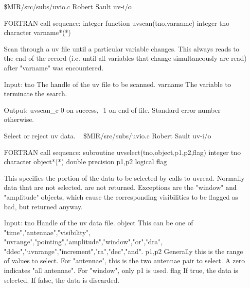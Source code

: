 \newline {} \$MIR/src/subs/uvio.c
\newline {} Robert Sault
\newline {} uv-i/o
\par{\tenpoint
{\eightpoint\begintt
FORTRAN call sequence:
        integer function uvscan(tno,varname)
        integer tno
        character varname*(*)

  Scan through a uv file until a particular variable changes. This always
  reads to the end of the record (i.e. until all variables that change
  simultaneously are read) after "varname" was encountered.

  Input:
    tno         The handle of the uv file to be scanned.
    varname     The variable to terminate the search.

  Output:
    uvscan_c    0 on success, -1 on end-of-file. Standard error
                number otherwise.                                       
\endtt}
\par}
%
\noindent Select or reject uv data.
\newline \ 
\newline {} \$MIR/src/subs/uvio.c
\newline {} Robert Sault
\newline {} uv-i/o
\par{\tenpoint
{\eightpoint\begintt
FORTRAN call sequence:
        subroutine uvselect(tno,object,p1,p2,flag)
        integer tno
        character object*(*)
        double precision p1,p2
        logical flag

  This specifies the portion of the data to be selected by calls to
  uvread. Normally data that are not selected, are not returned.
  Exceptions are the "window" and "amplitude" objects, which cause the
  corresponding visibilities to be flagged as bad, but returned anyway.

  Input:
    tno         Handle of the uv data file.
    object      This can be one of "time","antennae","visibility",
                "uvrange","pointing","amplitude","window","or","dra",
                "ddec","uvnrange","increment","ra","dec","and".
    p1,p2       Generally this is the range of values to select. For
                "antennae", this is the two antennae pair to select.
                A zero indicates "all antennae".
                For "window", only p1 is used.
    flag        If true, the data is selected. If false, the data is
                discarded.                                              
\endtt}
\par}
